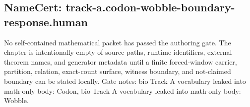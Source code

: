 \subsection{NameCert: track-a.codon-wobble-boundary-response.human}
\label{sec:namecert-track_a_codon_wobble_boundary_response_human}

No self-contained mathematical packet has passed the authoring gate. The chapter is intentionally empty of source paths, runtime identifiers, external theorem names, and generator metadata until a finite forced-window carrier, partition, relation, exact-count surface, witness boundary, and not-claimed boundary can be stated locally. Gate notes: bio Track A vocabulary leaked into math-only body: Codon, bio Track A vocabulary leaked into math-only body: Wobble.
